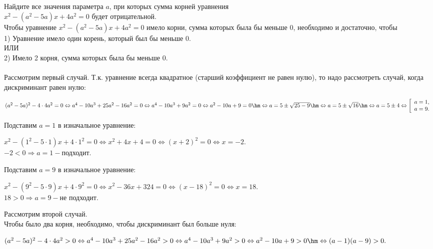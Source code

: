  Найдите все значения параметра $a$, при которых сумма корней уравнения\\ $x^2-\left(a^2-5a\right)x+4a^2=0$  будет отрицательной.\\
\Solution
\n Чтобы уравнение $x^2-\left(a^2-5a\right)x+4a^2=0$ имело корни, сумма которых была бы меньше $0$, необходимо и достаточно, чтобы\\
1) Уравнение имело один корень, который был бы меньше $0$.\\
ИЛИ\\
2) Имело 2 корня, сумма которых была бы меньше $0$.
\\
\\\n Рассмотрим первый случай. Т.к. уравнение всегда квадратное (старший коэффициент не равен нулю), то надо рассмотреть случай, когда дискриминант равен нулю:
\begin{center}
$(a^2-5a)^2-4\cdot4a^2=0\Leftrightarrow a^4-10a^3+25a^2-16a^2=0 \Leftrightarrow a^4-10a^3+9a^2=0 \Leftrightarrow a^2-10a+9 = 0 \hm\Leftrightarrow a=5\pm\sqrt{25-9} \hm\Leftrightarrow a=5\pm\sqrt{16} \hm\Leftrightarrow a=5\pm4\Leftrightarrow \left[ 
\begin{array}{l}
a=1,\\
a=9. 
\end{array} \right.$
\end{center}
Подставим $a=1$ в изначальное уравнение:\\
\begin{center}
$x^2-(1^2-5\cdot1)x+4\cdot1^2=0\Leftrightarrow x^2+4x+4 = 0\Leftrightarrow (x+2)^2 = 0\Leftrightarrow x=-2.$\\
$-2<0 \Rightarrow a=1 - \text{подходит}.$\\\end{center}
Подставим $a=9$ в изначальное уравнение:\\
\begin{center}
$x^2-(9^2-5\cdot9)x+4\cdot9^2=0\Leftrightarrow x^2-36x+324 = 0\Leftrightarrow (x-18)^2=0\Leftrightarrow x=18.$\\
$18>0\Rightarrow a=9 - \text{не подходит}.$\\\end{center}
\n Рассмотрим второй случай.\\
Чтобы было два корня, необходимо, чтобы дискриминант был больше нуля:
\begin{center}
$(a^2-5a)^2-4\cdot4a^2 > 0\Leftrightarrow a^4-10a^3+25a^2-16a^2 > 0\Leftrightarrow a^4-10a^3+9a^2 > 0\Leftrightarrow a^2-10a+9 > 0\hm\Leftrightarrow (a-1)(a-9)>0.$
	\end{center}
